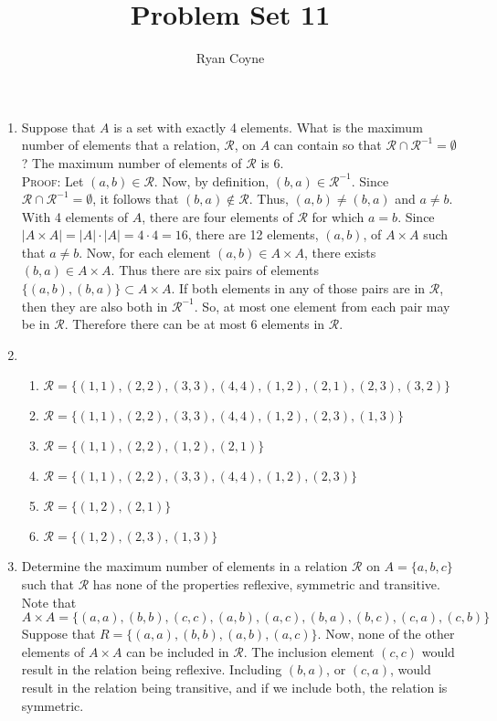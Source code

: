\documentclass[12pt]{article}
\newcommand{\mc}[1]{\mathcal{#1}}
\begin{document}
    \title{Problem Set 11}
    \author{Ryan Coyne}
    \maketitle

    \begin{enumerate}
        \item Suppose that \(A\) is a set with exactly 4 elements. What is the maximum number of elements that a relation, \(\mathcal{R}\), on \(A\) can contain so that \(\mathcal{R} \cap \mathcal{R}^{-1} = \emptyset\)? The maximum number of elements of \(\mathcal{R}\) is 6.\\ \textsc{Proof:} Let \((a,b)\in \mc{R}\). Now, by definition, \((b,a) \in \mc{R}^{-1}\). Since \(\mc{R}\cap\mc{R}^{-1}=\emptyset\), it follows that \((b,a)\not\in\mc R\). Thus, \((a,b)\neq(b,a)\) and \(a\neq b\). With 4 elements of \(A\), there are four elements of \(\mc R\) for which \(a=b\). Since \(|A\times A| = |A|\cdot|A| = 4\cdot4 = 16\), there are 12 elements, \((a,b)\), of \(A\times A\) such that \(a \neq b\).  Now, for each element \((a,b)\in A\times A\), there exists \((b,a)\in A\times A\). Thus there are six pairs of elements \(\{(a,b), (b,a)\}\subset A\times A\). If both elements in any of those pairs are in \(\mc R\), then they are also both in \(\mc R^{-1}\). So, at most one element from each pair may be in \(\mc R\). Therefore there can be at most 6 elements in \(\mc R\).
        \item \begin{enumerate}
            \item \(\mc R = \{(1,1), (2,2), (3,3), (4,4), (1,2), (2,1), (2,3), (3,2)\}\)
            \item \(\mc R = \{(1,1), (2,2), (3,3), (4,4), (1,2), (2,3), (1,3)\}\)
            \item \(\mc R = \{(1,1), (2,2), (1,2), (2,1)\}\)
            \item \(\mc R = \{(1,1), (2,2), (3,3), (4,4), (1, 2), (2, 3)\}\)
            \item \(\mc R = \{(1,2), (2,1)\}\)
            \item \(\mc R = \{(1,2), (2,3), (1,3)\}\)
        \end{enumerate}
        \item Determine the maximum number of elements in a relation \(\mc R\) on \(A = \{a, b, c\}\) such that \(\mc R\) has none of the properties reflexive, symmetric and transitive. Note that \(A \times A  = \{(a, a), (b,b), (c,c), (a,b), (a,c), (b, a), (b,c), (c, a), (c,b)\}\) Suppose that \(R = \{(a, a), (b,b), (a,b), (a,c)\}\). Now, none of the other elements of \(A\times A\) can be included in \(\mc R\). The inclusion element \((c,c)\) would result in the relation being reflexive. Including \((b,a)\), or \((c, a)\), would result in the relation being transitive, and if we include both, the relation is symmetric.

\end{enumerate}
\end{document}
